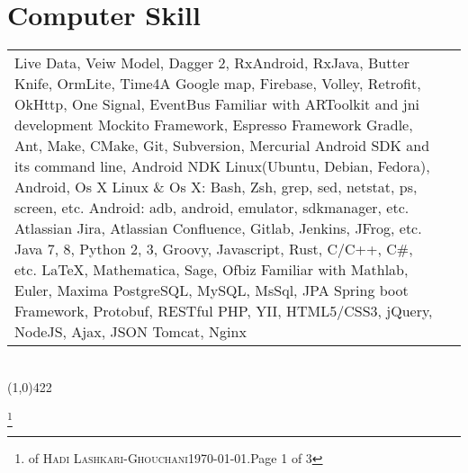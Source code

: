\documentclass[10pt]{article}
\newcommand{\maxpages}{3}
\newcommand{\maxpages}{3}
\newcommand\HRule{\hspace*{.8cm}\line(1,0){422}\\}
\newenvironment{Record}[1]
{
    \vspace{-0.5cm}
    \section*{#1}
        \vspace{0.1cm}
        \begin{tabular}
}
{
        \end{tabular}\\
        \HRule
}
\newcommand{\FootNote}[1]{\let\thefootnote\relax\footnote{\smallsnellfont{\textbf{\textit{Curriculum Vitae}}} of \textsc{Hadi Lashkari-Ghouchani}\qquad\today.\qquad Page #1 of \maxpages}}
\begin{document}
\begin{Record}{Computer Skill}{l l}
    \ComputerSkill{Android Library}
        {Live Data, Veiw Model, Dagger 2, RxAndroid, RxJava, Butter Knife, OrmLite, Time4A}
        {Google map, Firebase, Volley, Retrofit, OkHttp, One Signal, EventBus}
        {Familiar with ARToolkit and jni development}{}{}%
    \ComputerSkill{Android Test Library}
        {Mockito Framework, Espresso Framework}{}{}{}{}%
    \ComputerSkill{Tool}
        {Gradle, Ant, Make, CMake, Git, Subversion, Mercurial}
        {Android SDK and its command line, Android NDK}{}{}{}%
    \ComputerSkill{Operating System}
        {Linux(Ubuntu, Debian, Fedora), Android, Os X}{}{}{}{}%
    \ComputerSkill{Operating System tool}
        {Linux \& Os X: Bash, Zsh, grep, sed, netstat, ps, screen, etc.}
        {Android: adb, android, emulator, sdkmanager, etc.}{}{}{}%
    \ComputerSkill{Development tool}
        {Atlassian Jira, Atlassian Confluence, Gitlab, Jenkins, JFrog, etc.}
        {}{}{}{}%
    \ComputerSkill{Language}
        {Java 7, 8, Python 2, 3, Groovy, Javascript, Rust, C/C++, C\#, etc.}
        {}{}{}{}%
    \ComputerSkill{Special Software}
        {\LaTeX, Mathematica, Sage, Ofbiz}
        {Familiar with Mathlab, Euler, Maxima}{}{}{}%
    \ComputerSkill{Back-End Development}
        {PostgreSQL, MySQL, MsSql, JPA}
        {Spring boot Framework, Protobuf, RESTful}
        {PHP, YII, HTML5/CSS3, jQuery, NodeJS, Ajax, JSON}
        {Tomcat, Nginx}{}%
\end{Record}


\FootNote{1}

\end{document}
